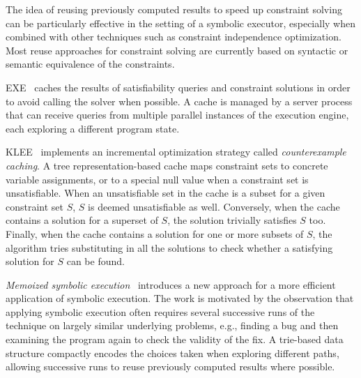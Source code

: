 


The idea of reusing previously computed results to speed up constraint solving can be particularly effective in the setting of a symbolic executor, especially when combined with other techniques such as constraint independence optimization. Most reuse approaches for constraint solving are currently based on syntactic or semantic equivalence of the constraints.

{\sc EXE}~\cite{EXE-CCS06} caches the results of satisfiability queries and constraint solutions in order to avoid calling the solver when possible. A cache is managed by a server process that can receive queries from multiple parallel instances of the execution engine, each exploring a different program state.

{\sc KLEE}~\cite{KLEE-OSDI08} implements an incremental optimization strategy called {\em counterexample caching}. A tree representation-based cache maps constraint sets to concrete variable assignments, or to a special null value when a constraint set is unsatisfiable. When an unsatisfiable set in the cache is a subset for a given constraint set $S$, $S$ is deemed unsatisfiable as well. Conversely, when the cache contains a solution for a superset of $S$, the solution trivially satisfies $S$ too. Finally, when the cache contains a solution for one or more subsets of $S$, the algorithm tries substituting in all the solutions to check whether a satisfying solution for $S$ can be found.

{\em Memoized symbolic execution}~\cite{MEMO-ISSTA12} introduces a new approach for a more efficient application of symbolic execution. The work is motivated by the observation that applying symbolic execution often requires several successive runs of the technique on largely similar underlying problems, e.g., finding a bug and then examining the program again to check the validity of the fix. A trie-based data structure compactly encodes the choices taken when exploring different paths, allowing successive runs to reuse previously computed results where possible.

